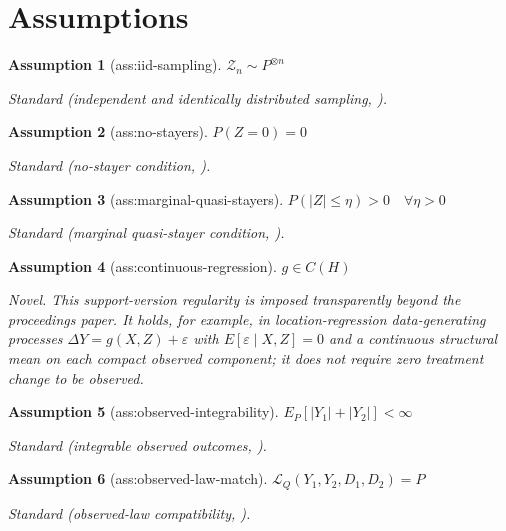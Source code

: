\documentclass{article}
\newtheorem{assumption}{Assumption}
\begin{document}
\section{Assumptions}

\begin{assumption}[ass:iid-sampling]\label{ass:iid-sampling}
\(\mathcal Z_n\sim P^{\otimes n}\)
\par\smallskip\noindent\emph{Standard} (independent and identically distributed sampling, \cite{deChaisemartinDHaultfoeuilleVazquezBare2024NoStayers}).
\end{assumption}

\begin{assumption}[ass:no-stayers]\label{ass:no-stayers}
\(P(Z=0)=0\)
\par\smallskip\noindent\emph{Standard} (no-stayer condition, \cite{deChaisemartinDHaultfoeuilleVazquezBare2024NoStayers}).
\end{assumption}

\begin{assumption}[ass:marginal-quasi-stayers]\label{ass:marginal-quasi-stayers}
\(P(|Z|\le\eta)>0\quad\forall\eta>0\)
\par\smallskip\noindent\emph{Standard} (marginal quasi-stayer condition, \cite{deChaisemartinDHaultfoeuilleVazquezBare2024NoStayers}).
\end{assumption}

\begin{assumption}[ass:continuous-regression]\label{ass:continuous-regression}
\(g\in C(H)\)
\par\smallskip\noindent\emph{Novel.} This support-version regularity is imposed transparently beyond the proceedings paper. It holds, for example, in location-regression data-generating processes \(\Delta Y=g(X,Z)+\varepsilon\) with \(E[\varepsilon\mid X,Z]=0\) and a continuous structural mean on each compact observed component; it does not require zero treatment change to be observed.
\end{assumption}

\begin{assumption}[ass:observed-integrability]\label{ass:observed-integrability}
\(E_P[|Y_1|+|Y_2|]<\infty\)
\par\smallskip\noindent\emph{Standard} (integrable observed outcomes, \cite{deChaisemartinDHaultfoeuilleVazquezBare2024NoStayers}).
\end{assumption}

\begin{assumption}[ass:observed-law-match]\label{ass:observed-law-match}
\(\mathcal L_Q(Y_1,Y_2,D_1,D_2)=P\)
\par\smallskip\noindent\emph{Standard} (observed-law compatibility, \cite{BeresteanuMolchanovMolinari2011ConvexMomentPredictions}).
\end{assumption}
\end{document}
